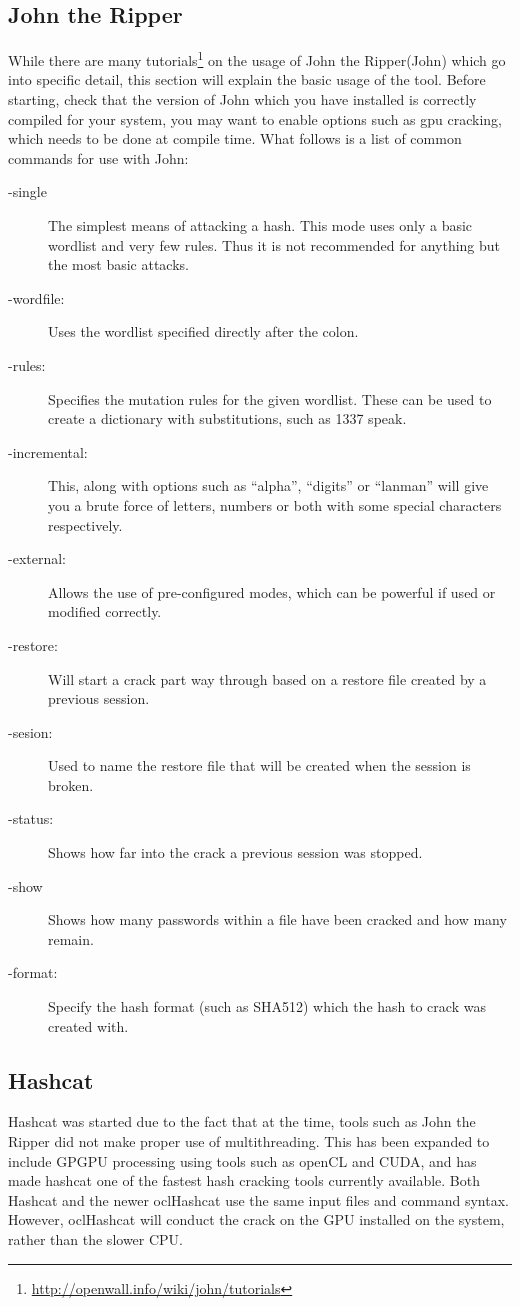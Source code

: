 \documentclass[a4paper,11pt]{report}
\begin{document}
		\subsection{John the Ripper}
			While there are many tutorials\footnote{\url{http://openwall.info/wiki/john/tutorials}} on the usage of John the Ripper(John) which go into specific detail, this section will explain the basic usage of the tool. 
			Before starting, check that the version of John which you have installed is correctly compiled for your system, you may want to enable options such as gpu cracking, which needs to be done at compile time. 
			What follows is a list of common commands for use with John:
			\begin{description}
				\item[-single]
					The simplest means of attacking a hash. 
					This mode uses only a basic wordlist and very few rules. 
					Thus it is not recommended for anything but the most basic attacks. 
				\item[-wordfile:]
					Uses the wordlist specified directly after the colon. 
				\item[-rules:]
					Specifies the mutation rules for the given wordlist. 
					These can be used to create a dictionary with substitutions, such as 1337 speak. 
				\item[-incremental:]
					This, along with options such as ``alpha'', ``digits'' or ``lanman'' will give you a brute force of letters, numbers or both with some special characters respectively. 
				\item[-external:]
					Allows the use of pre-configured modes, which can be powerful if used or modified correctly. 
				\item[-restore:]
					Will start a crack part way through based on a restore file created by a previous session. 
				\item[-sesion:]
					Used to name the restore file that will be created when the session is broken. 
				\item[-status:]
					Shows how far into the crack a previous session was stopped. 
				\item[-show]
					Shows how many passwords within a file have been cracked and how many remain. 
				\item[-format:]
					Specify the hash format (such as SHA512) which the hash to crack was created with. 
			\end{description}
			
		\subsection{Hashcat}
			Hashcat was started due to the fact that at the time, tools such as John the Ripper did not make proper use of multithreading. 
			This has been expanded to include GPGPU processing using tools such as openCL and CUDA, and has made hashcat one of the fastest hash cracking tools currently available. 
			Both Hashcat and the newer oclHashcat use the same input files and command syntax. 
			However, oclHashcat will conduct the crack on the GPU installed on the system, rather than the slower CPU. 
\end{document}
